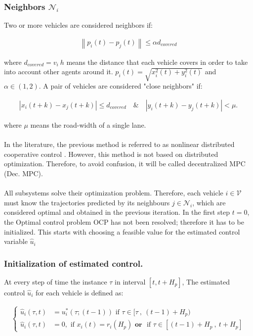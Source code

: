 \subsubsection{Neighbors $\mathcal{N}_i$}
Two or more vehicles are considered neighbors if:

\begin{align}
    \left\| p_i(t) - p_j(t) \right\| \le  \alpha d_{covered}
\end{align}

where $d_{covered} = v_i\ h$ means the distance that each vehicle covers in order to take into account other agents around it. $p_i(t)= \sqrt{x^2_i(t) + y^2_i(t)}$ and $\alpha \in (1,2)$. A pair of vehicles are considered "close neighbors" if:

\begin{align}
    \left| x_i(t+k) - x_j(t+k) \right| \le  d_{covered} \quad \& \quad \left| y_i(t+k) - y_j(t+k) \right| \lt \mu.
\end{align}

where $\mu$ means the road-width of a single lane.  
\\
\\
In the literature, the previous method is referred to as nonlinear distributed cooperative control \cite{12t_Dist_multiagent, 13t_distributed,32t_DMPC,51t_aveh2veh}. However, this method is not based on distributed optimization. Therefore, to avoid confusion, it will be called decentralized MPC (Dec. MPC).
\\
\\
All subsystems solve their optimization problem. Therefore, each vehicle $i \in \mathcal{V}$ must know the trajectories predicted by its neighbours $j \in \mathcal{N}_i$, which are considered optimal and obtained in the previous iteration. In the first step $t=0$, the Optimal control problem OCP has not been resolved; therefore it has to be initialized. This starts with choosing a feasible value for the estimated control variable $\hat{u}_i$

\subsubsection{Initialization of estimated control. }
At every step of time the instance $\tau$ in interval $[t, t+ H_p]$, The estimated control $\hat{u}_i$ for each vehicle is defined as:

\begin{align}
    \left\{ \begin{array}{cl}
\hat{u}_i(\tau, t) & = u^*_i(\tau;(t-1)) \text{  if }\tau \in [\tau \ ,\ (t-1) + H_p) \\
\hat{u}_i(\tau, t) & = 0, \text{ if } x_i(t) = r_i(H_p) \textbf{ or } \text{ if } \tau \in [(t-1)+H_p \ ,\  t+H_p] 
\end{array} \right.
\label{eq:416}
\end{align}


